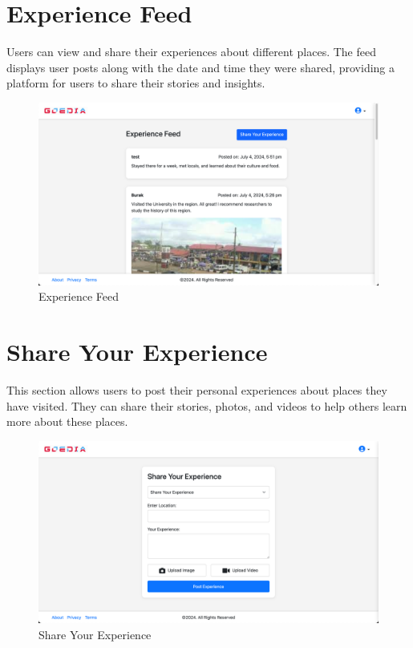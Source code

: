 \section{Experience Feed}
Users can view and share their experiences about different places. The feed displays user posts along with the date and time they were shared, providing a platform for users to share their stories and insights.

\begin{figure}[H]
    \centering
    \includegraphics[width=\textwidth]{experienceFeed.png}
    \caption{Experience Feed}
    \label{fig:experienceFeed}
\end{figure}

\section{Share Your Experience}
This section allows users to post their personal experiences about places they have visited. They can share their stories, photos, and videos to help others learn more about these places.

\begin{figure}[H]
    \centering
    \includegraphics[width=\textwidth]{shareYourexperience.png}
    \caption{Share Your Experience}
    \label{fig:shareYourexperience}
\end{figure}

